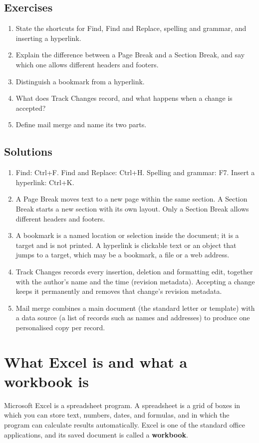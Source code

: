 \subsection*{Exercises}
\begin{enumerate}[label=\arabic*.]
  \item State the shortcuts for Find, Find and Replace, spelling and grammar,
    and inserting a hyperlink.
  \item Explain the difference between a Page Break and a Section Break, and
    say which one allows different headers and footers.
  \item Distinguish a bookmark from a hyperlink.
  \item What does Track Changes record, and what happens when a change is
    accepted?
  \item Define mail merge and name its two parts.
\end{enumerate}

\subsection*{Solutions}
\begingroup\small
\begin{enumerate}[label=\arabic*.]
  \item Find: Ctrl+F. Find and Replace: Ctrl+H. Spelling and grammar: F7.
    Insert a hyperlink: Ctrl+K.
  \item A Page Break moves text to a new page within the same section. A
    Section Break starts a new section with its own layout. Only a Section
    Break allows different headers and footers.
  \item A bookmark is a named location or selection inside the document; it is
    a target and is not printed. A hyperlink is clickable text or an object
    that jumps to a target, which may be a bookmark, a file or a web address.
  \item Track Changes records every insertion, deletion and formatting edit,
    together with the author's name and the time (revision metadata). Accepting
    a change keeps it permanently and removes that change's revision metadata.
  \item Mail merge combines a main document (the standard letter or template)
    with a data source (a list of records such as names and addresses) to
    produce one personalised copy per record.
\end{enumerate}
\endgroup

\section{What Excel is and what a workbook is}
Microsoft Excel is a spreadsheet program. A spreadsheet is a grid of boxes
in which you can store text, numbers, dates, and formulas, and in which the
program can calculate results automatically. Excel is one of the standard
office applications, and its saved document is called a \textbf{workbook}.


